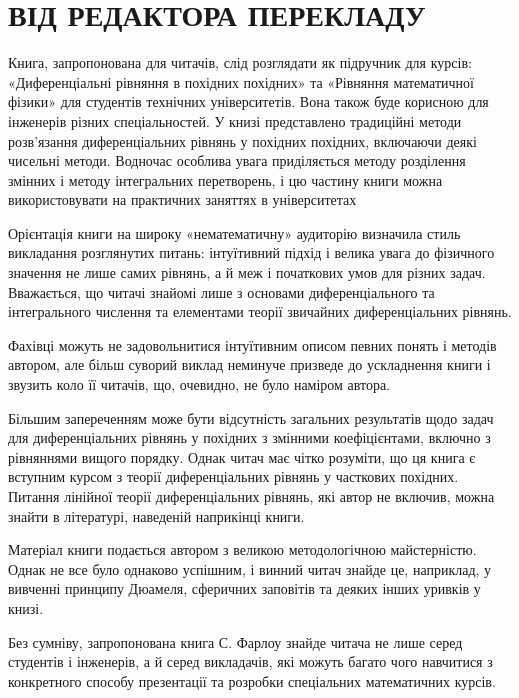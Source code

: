 \documentclass[
]{article}
\begin{document}
\section{ВІД РЕДАКТОРА
ПЕРЕКЛАДУ}\label{ux432ux456ux434-ux440ux435ux434ux430ux43aux442ux43eux440ux430-ux43fux435ux440ux435ux43aux43bux430ux434ux443}

Книга, запропонована для читачів, слід розглядати як підручник для
курсів: «Диференціальні рівняння в похідних похідних» та «Рівняння
математичної фізики» для студентів технічних університетів. Вона також
буде корисною для інженерів різних спеціальностей. У книзі представлено
традиційні методи розв'язання диференціальних рівнянь у похідних
похідних, включаючи деякі чисельні методи. Водночас особлива увага
приділяється методу розділення змінних і методу інтегральних
перетворень, і цю частину книги можна використовувати на практичних
заняттях в університетах

Орієнтація книги на широку «нематематичну» аудиторію визначила стиль
викладання розглянутих питань: інтуїтивний підхід і велика увага до
фізичного значення не лише самих рівнянь, а й меж і початкових умов для
різних задач. Вважається, що читачі знайомі лише з основами
диференціального та інтегрального числення та елементами теорії
звичайних диференціальних рівнянь.

Фахівці можуть не задовольнитися інтуїтивним описом певних понять і
методів автором, але більш суворий виклад неминуче призведе до
ускладнення книги і звузить коло її читачів, що, очевидно, не було
наміром автора.

Більшим запереченням може бути відсутність загальних результатів щодо
задач для диференціальних рівнянь у похідних з змінними коефіцієнтами,
включно з рівняннями вищого порядку. Однак читач має чітко розуміти, що
ця книга є вступним курсом з теорії диференціальних рівнянь у часткових
похідних. Питання лінійної теорії диференціальних рівнянь, які автор не
включив, можна знайти в літературі, наведеній наприкінці книги.

Матеріал книги подається автором з великою методологічною майстерністю.
Однак не все було однаково успішним, і винний читач знайде це,
наприклад, у вивченні принципу Дюамеля, сферичних заповітів та деяких
інших уривків у книзі.

Без сумніву, запропонована книга С. Фарлоу знайде читача не лише серед
студентів і інженерів, а й серед викладачів, які можуть багато чого
навчитися з конкретного способу презентації та розробки спеціальних
математичних курсів.
\end{document}
